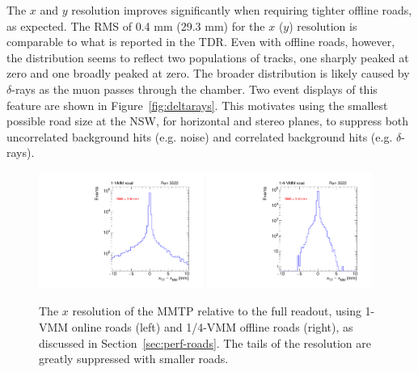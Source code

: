 The $x$ and $y$ resolution improves significantly when requiring tighter offline roads, as expected. The RMS of 0.4 mm (29.3 mm) for the $x$ ($y$) resolution is comparable to what is reported in the TDR. Even with offline roads, however, the distribution seems to reflect two populations of tracks, one sharply peaked at zero and one broadly peaked at zero. The broader distribution is likely caused by $\delta$-rays as the muon passes through the chamber. Two event displays of this feature are shown in Figure~\ref{fig:deltarays}. This motivates using the smallest possible road size at the NSW, for horizontal and stereo planes, to suppress both uncorrelated background hits (e.g. noise) and correlated background hits (e.g. $\delta$-rays).

\begin{figure}[!htpb]
  \begin{center}
    \includegraphics[width=0.48\textwidth]{figures/gbtanalysis3522/TP_xres_full.pdf}
    \includegraphics[width=0.48\textwidth]{figures/gbtanalysis3522/TP_xres.pdf}
  \end{center}
  \vspace{-10pt}
  \caption{The $x$ resolution of the MMTP relative to the full readout, using 1-VMM online roads (left) and 1/4-VMM offline roads (right), as discussed in Section~\ref{sec:perf-roads}. The tails of the resolution are greatly suppressed with smaller roads.}
  \label{fig:xres}
\end{figure}

